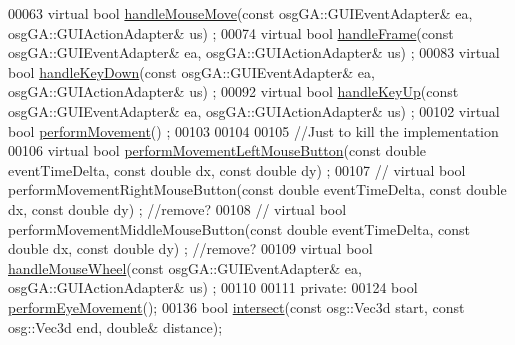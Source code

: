\begin{DoxyCode}
00063         \textcolor{keyword}{virtual} \textcolor{keywordtype}{bool} \hyperlink{classbrtr_1_1_f_p_s_camera_manipulator_a2f6319fa6eb148e2f5b59688b38891ae}{handleMouseMove}(\textcolor{keyword}{const} osgGA::GUIEventAdapter& ea, 
      osgGA::GUIActionAdapter& us) ;
00074         \textcolor{keyword}{virtual} \textcolor{keywordtype}{bool} \hyperlink{classbrtr_1_1_f_p_s_camera_manipulator_abad7544ac96384f79b2fa0d5d91606f6}{handleFrame}(\textcolor{keyword}{const} osgGA::GUIEventAdapter& ea, osgGA::GUIActionAdapter& us) 
      ;
00083         \textcolor{keyword}{virtual} \textcolor{keywordtype}{bool} \hyperlink{classbrtr_1_1_f_p_s_camera_manipulator_ad12557e5ce643476c8850c91a59e4956}{handleKeyDown}(\textcolor{keyword}{const} osgGA::GUIEventAdapter& ea, osgGA::GUIActionAdapter& 
      us) ;
00092         \textcolor{keyword}{virtual} \textcolor{keywordtype}{bool} \hyperlink{classbrtr_1_1_f_p_s_camera_manipulator_a165a843388846d16426adcf0cd870b5e}{handleKeyUp}(\textcolor{keyword}{const} osgGA::GUIEventAdapter& ea, osgGA::GUIActionAdapter& us) 
      ;       
00102         \textcolor{keyword}{virtual} \textcolor{keywordtype}{bool} \hyperlink{classbrtr_1_1_f_p_s_camera_manipulator_a5c9aa59e32263262b24595ecf57dace6}{performMovement}() ;
00103         
00104 
00105         \textcolor{comment}{//Just  to kill the implementation}
00106         \textcolor{keyword}{virtual} \textcolor{keywordtype}{bool} \hyperlink{classbrtr_1_1_f_p_s_camera_manipulator_acbda7c2bbd00f5b143723bd7a85f9e9d}{performMovementLeftMouseButton}(\textcolor{keyword}{const} \textcolor{keywordtype}{double} 
      eventTimeDelta, \textcolor{keyword}{const} \textcolor{keywordtype}{double} dx, \textcolor{keyword}{const} \textcolor{keywordtype}{double} dy) ;
00107        \textcolor{comment}{// virtual bool performMovementRightMouseButton(const double eventTimeDelta, const double dx, const
       double dy) ; //remove?}
00108        \textcolor{comment}{// virtual bool performMovementMiddleMouseButton(const double eventTimeDelta, const double dx, const
       double dy) ; //remove?}
00109         \textcolor{keyword}{virtual} \textcolor{keywordtype}{bool} \hyperlink{classbrtr_1_1_f_p_s_camera_manipulator_a02b5f77aca53a0974b81d0dfadd811cd}{handleMouseWheel}(\textcolor{keyword}{const} osgGA::GUIEventAdapter& ea, 
      osgGA::GUIActionAdapter& us) ;
00110 
00111     \textcolor{keyword}{private}:
00124         \textcolor{keywordtype}{bool} \hyperlink{classbrtr_1_1_f_p_s_camera_manipulator_aac9cc9e147b61f0afee6d02a98584271}{performEyeMovement}();
00136         \textcolor{keywordtype}{bool} \hyperlink{classbrtr_1_1_f_p_s_camera_manipulator_af6bc3644bd39ad6f8fed053dc97aeb0e}{intersect}(\textcolor{keyword}{const} osg::Vec3d start, \textcolor{keyword}{const} osg::Vec3d end, \textcolor{keywordtype}{double}& distance);

\end{DoxyCode}
